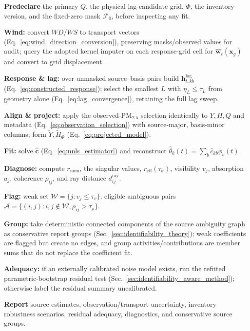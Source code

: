 \begin{algorithm}[t]
\caption{Identifiability-Aware Source Apportionment}
\label{alg:iasa}
\footnotesize
\begin{algsteps}
  \item \textbf{Predeclare} the primary \(Q\), the physical lag-candidate grid,
  \(\Phi\), the inventory version, and the fixed-zero mask \(\mathcal F_0\),
  before inspecting any fit.
  \item \textbf{Wind:} convert \(\mathit{WD}/\mathit{WS}\) to transport vectors
  (Eq.~\ref{eq:wind_direction_conversion}), preserving masks/observed values for
  audit; query the adopted kernel imputer on each response-grid cell for
  \(\widehat{\mathbf w}_t(\mathbf x_g)\) and convert to grid displacement.
  \item \textbf{Response \& lag:} over unmasked source--basis pairs build
  \(\mathbf h_{t,kb}^{\mathrm{lag}}\) (Eq.~\ref{eq:constructed_response}); select
  the smallest \(L\) with \(\eta_L\le\tau_L\) from geometry alone
  (Eq.~\ref{eq:lag_convergence}), retaining the full lag sweep.
  \item \textbf{Align \& project:} apply the observed-PM\(_{2.5}\) selection
  identically to \(Y,H,Q\) and metadata (Eq.~\ref{eq:observation_selection}) with
  source-major, basis-minor columns; form \(\widetilde Y,\widetilde H_\Phi\)
  (Eq.~\ref{eq:projected_model}).
  \item \textbf{Fit:} solve \(\widehat{\mathbf c}\)
  (Eq.~\ref{eq:nnls_estimator}) and reconstruct
  \(\widehat\theta_k(t)=\sum_b\widehat c_{kb}\phi_b(t)\).
  \item \textbf{Diagnose:} compute \(r_{\mathrm{num}}\), the singular values,
  \(r_{\mathrm{eff}}(\tau_\sigma)\), visibility \(v_j\), absorption \(a_j\),
  coherence \(\rho_{ij}\), and ray distance \(d^{\mathrm{ray}}_{ij}\).
  \item \textbf{Flag:} weak set \(\mathcal W=\{j:v_j\le\tau_v\}\); eligible
  ambiguous pairs \(\mathcal A=\{(i,j):i,j\notin\mathcal W,\rho_{ij}>\tau_\rho\}\).
  \item \textbf{Group:} take deterministic connected components of the source
  ambiguity graph as conservative report groups
  (Sec.~\ref{sec:identifiability_theory}); weak coefficients are flagged but create no
  edges, and group activities/contributions are member sums that do not replace
  the coefficient fit.
  \item \textbf{Adequacy:} if an externally calibrated noise model exists, run
  the refitted parametric-bootstrap residual test
  (Sec.~\ref{sec:identifiability_aware_method}); otherwise label the residual summary
  uncalibrated.
  \item \textbf{Report} source estimates, observation/transport uncertainty,
  inventory robustness scenarios, residual adequacy, diagnostics, and
  conservative source groups.
\end{algsteps}
\end{algorithm}

